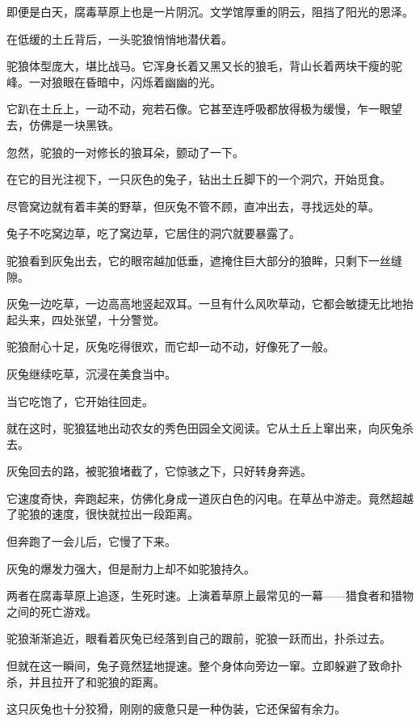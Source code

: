 
\begin{this_body}

即便是白天，腐毒草原上也是一片阴沉。文学馆厚重的阴云，阻挡了阳光的恩泽。

在低缓的土丘背后，一头驼狼悄悄地潜伏着。

驼狼体型庞大，堪比战马。它浑身长着又黑又长的狼毛，背山长着两块干瘦的驼峰。一对狼眼在昏暗中，闪烁着幽幽的光。

它趴在土丘上，一动不动，宛若石像。它甚至连呼吸都放得极为缓慢，乍一眼望去，仿佛是一块黑铁。

忽然，驼狼的一对修长的狼耳朵，颤动了一下。

在它的目光注视下，一只灰色的兔子，钻出土丘脚下的一个洞穴，开始觅食。

尽管窝边就有着丰美的野草，但灰兔不管不顾，直冲出去，寻找远处的草。

兔子不吃窝边草，吃了窝边草，它居住的洞穴就要暴露了。

驼狼看到灰兔出去，它的眼帘越加低垂，遮掩住巨大部分的狼眸，只剩下一丝缝隙。

灰兔一边吃草，一边高高地竖起双耳。一旦有什么风吹草动，它都会敏捷无比地抬起头来，四处张望，十分警觉。

驼狼耐心十足，灰兔吃得很欢，而它却一动不动，好像死了一般。

灰兔继续吃草，沉浸在美食当中。

当它吃饱了，它开始往回走。

就在这时，驼狼猛地出动农女的秀色田园全文阅读。它从土丘上窜出来，向灰兔杀去。

灰兔回去的路，被驼狼堵截了，它惊骇之下，只好转身奔逃。

它速度奇快，奔跑起来，仿佛化身成一道灰白色的闪电。在草丛中游走。竟然超越了驼狼的速度，很快就拉出一段距离。

但奔跑了一会儿后，它慢了下来。

灰兔的爆发力强大，但是耐力上却不如驼狼持久。

两者在腐毒草原上追逐，生死时速。上演着草原上最常见的一幕——猎食者和猎物之间的死亡游戏。

驼狼渐渐追近，眼看着灰兔已经落到自己的跟前，驼狼一跃而出，扑杀过去。

但就在这一瞬间，兔子竟然猛地提速。整个身体向旁边一窜。立即躲避了致命扑杀，并且拉开了和驼狼的距离。

这只灰兔也十分狡猾，刚刚的疲惫只是一种伪装，它还保留有余力。


\end{this_body}
